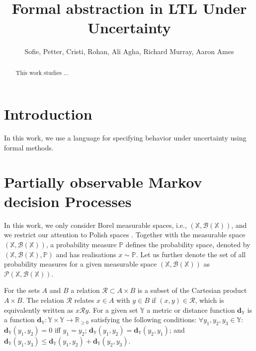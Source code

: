 \documentclass[conference]{IEEEtran}
\newcommand{\X}{{\mathbb{X}}}
\newcommand{\Y}{{\mathbb{Y}}}
\newcommand{\po}{\mathbb{P}}     %
\newcommand{\rel}{\mathcal{R}}%
\begin{document}

\title{\huge Formal abstraction in LTL Under Uncertainty}

\author{Sofie, Petter, Cristi, Rohan, Ali Agha, Richard Murray, Aaron Ames}

\maketitle

\begin{abstract}
This work studies ...
\end{abstract}

\IEEEpeerreviewmaketitle

	
\section{Introduction} \label{subsec:intro}
In this work, we use a language for specifying behavior under uncertainty using formal methods. 


\section{Partially observable Markov decision Processes}
In this work, we only consider  Borel measurable spaces, i.e., $(\X,\mathcal{B}(\X))$, 
and we restrict our attention to Polish spaces \cite{bogachev2007measure}. 
Together with the measurable space $(\X,\mathcal{B}(\X))$,  a probability measure $\po$ defines the probability space, denoted by $(\X,\mathcal{B}(\X),\po)$ and has realisations  $x\sim \po$.   
Let us further denote the set of all probability measures for a given measurable space $(\X,\mathcal{B}(\X))$ as $\mathcal P (\X,\mathcal{B}(\X))$.

For the sets $A$ and $B$ a relation $\rel\subset A\times B$ is a subset of the Cartesian product $A\times B$. The relation $\rel$ relates $x\in A$ with $y\in B$ if $(x,y)\in\rel$, which is equivalently written as $x\rel y$.
For a given set $\Y$ a metric or distance function $\mathbf d_\Y$ is a function $\mathbf{d}_\Y: \Y\times \Y\rightarrow \mathbb R_{\ge 0}$ 
satisfying the following conditions: 
$\forall y_1,y_2,y_3\in\Y$:
$\mathbf d_\Y(y_1,y_2)=0$ iff $y_1=y_2$; 
$\mathbf d_\Y(y_1,y_2)=\mathbf d_{\Y}(y_2,y_1)$;  and
$\mathbf d_\Y(y_1,y_3)\leq \mathbf d_\Y(y_1,y_2) +\mathbf d_\Y(y_2,y_3)$. 
 
\end{document}
